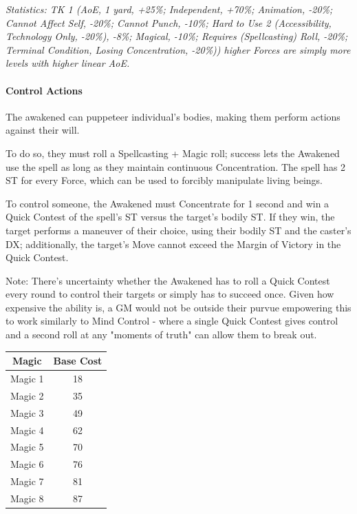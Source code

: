 \begin{multicols}{3}
	\textcolor{OliveGreen}{\textit{Statistics: TK 1 (AoE, 1 yard, +25\%; Independent, +70\%; Animation, -20\%; Cannot Affect Self, -20\%; Cannot Punch, -10\%; Hard to Use 2 (Accessibility, Technology Only, -20\%), -8\%; Magical, -10\%; Requires (Spellcasting) Roll, -20\%; Terminal Condition, Losing Concentration, -20\%)) higher Forces are simply more levels with higher linear AoE.}}
	
	\paragraph{Control Actions}
	
	The awakened can puppeteer individual's bodies, making them perform actions against their will.
	
	To do so, they must roll a Spellcasting + Magic roll; success lets the Awakened use the spell as long as they maintain continuous Concentration. The spell has 2 ST for every Force, which can be used to forcibly manipulate living beings.
	
	To control someone, the Awakened must Concentrate for 1 second and win a Quick Contest of the spell's ST versus the target's bodily ST. If they win, the target performs a maneuver of their choice, using their bodily ST and the caster's DX; additionally, the target's Move cannot exceed the Margin of Victory in the Quick Contest.
	
	Note: There's uncertainty whether the Awakened has to roll a Quick Contest every round to control their targets or simply has to succeed once. Given how expensive the ability is, a GM would not be outside their purvue empowering this to work similarly to Mind Control - where a single Quick Contest gives control and a second roll at any "moments of truth" can allow them to break out.
	
	\begin{center}
		\begin{tabular}{|c|c|}
			\hline
			Magic & Base Cost \\
			\hline
			\hline
			Magic 1 & 18 \\
			Magic 2 & 35 \\
			Magic 3 & 49 \\
			Magic 4 & 62 \\
			Magic 5 & 70 \\
			Magic 6 & 76 \\
			Magic 7 & 81 \\
			Magic 8 & 87 \\
			\hline
		\end{tabular}
	\end{center}
	

\end{multicols}
